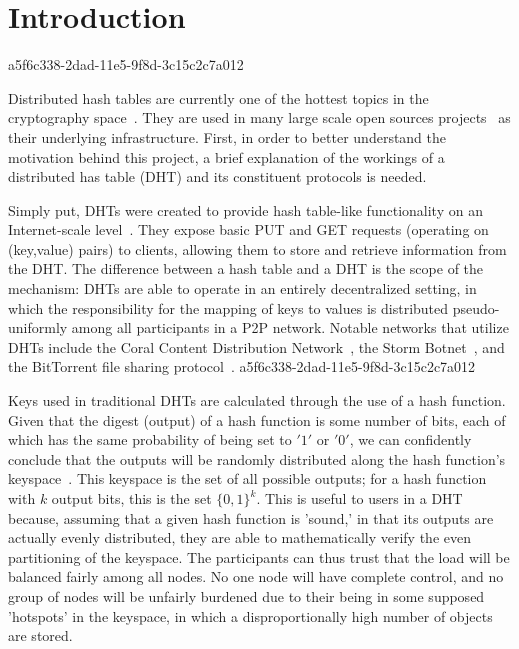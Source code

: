 \documentclass[12pt]{article}
\begin{document}
\section{Introduction}
a5f6c338-2dad-11e5-9f8d-3c15c2c7a012\par Distributed hash tables are currently one of the hottest topics in the cryptography space~\cite{Stoica:2001dj,Rowstron:2001ea,Ratnasamy:2001wn}. They are used in many large scale open sources projects~\cite{Freitas:2013tb,Xu:2010vs,Perfitt:2010fh} as their underlying infrastructure. First, in order to better understand the motivation behind this project, a brief explanation of the workings of a distributed has table (DHT) and its constituent protocols is needed.

\par Simply put, DHTs were created to provide hash table-like functionality on an Internet-scale level~\cite{Ratnasamy:2001wn}. They expose basic PUT and GET requests (operating on (key,value) pairs) to clients, allowing them to store and retrieve information from the DHT. The difference between a hash table and a DHT is the scope of the mechanism: DHTs are able to operate in an entirely decentralized setting, in which the responsibility for the mapping of keys to values is distributed pseudo-uniformly among all participants in a P2P network. Notable networks that utilize DHTs include the Coral Content Distribution Network~\cite{Freedman:2004vb}, the Storm Botnet~\cite{Holz:2008uk}, and the BitTorrent file sharing protocol~\cite{Cohen:y1_8mBnw}.
a5f6c338-2dad-11e5-9f8d-3c15c2c7a012
\par Keys used in traditional DHTs are calculated through the use of a hash function. Given that the digest (output) of a hash function is some number of bits, each of which has the same probability of being set to $'1'$ or $'0'$, we can confidently conclude that the outputs will be randomly distributed along the hash function's keyspace~. This keyspace is the set of all possible outputs; for a hash function with $k$ output bits, this is the set $\{0,1\}^k$. This is useful to users in a DHT because, assuming that a given hash function is 'sound,' in that its outputs are actually evenly distributed, they are able to mathematically verify the even partitioning of the keyspace. The participants can thus trust that the load will be balanced fairly among all nodes. No one node will have complete control, and no group of nodes will be unfairly burdened due to their being in some supposed 'hotspots' in the keyspace, in which a disproportionally high number of objects are stored.~
\end{document}
